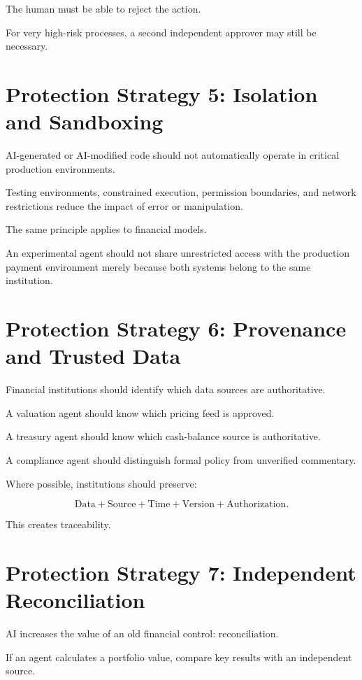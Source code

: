 The human must be able to reject the action.

For very high-risk processes, a second independent approver may still be necessary.

\section{Protection Strategy 5: Isolation and Sandboxing}

AI-generated or AI-modified code should not automatically operate in critical production environments.

Testing environments, constrained execution, permission boundaries, and network restrictions reduce the impact of error or manipulation.

The same principle applies to financial models.

An experimental agent should not share unrestricted access with the production payment environment merely because both systems belong to the same institution.

\section{Protection Strategy 6: Provenance and Trusted Data}

Financial institutions should identify which data sources are authoritative.

A valuation agent should know which pricing feed is approved.

A treasury agent should know which cash-balance source is authoritative.

A compliance agent should distinguish formal policy from unverified commentary.

Where possible, institutions should preserve:

\begin{equation}
\text{Data}
+
\text{Source}
+
\text{Time}
+
\text{Version}
+
\text{Authorization}.
\end{equation}

This creates traceability.

\section{Protection Strategy 7: Independent Reconciliation}

AI increases the value of an old financial control: reconciliation.

If an agent calculates a portfolio value, compare key results with an independent source.


